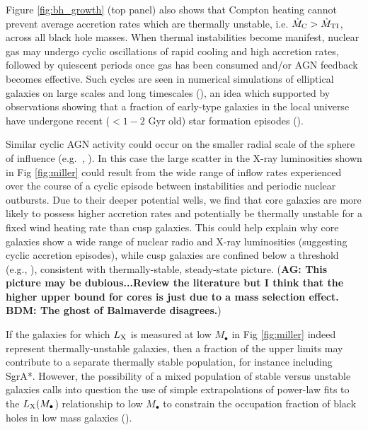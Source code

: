 \documentclass[usenatbib,fleqn]{mn2e}
\begin{document}
Figure \ref{fig:bh_growth} (top panel) also shows that Compton heating cannot prevent average
accretion rates which are thermally unstable, i.e. $\dot{M}_{\rm C} >
\dot{M}_{\rm TI}$, across all
black hole masses.  When thermal instabilities become manifest, nuclear gas may undergo cyclic oscillations of rapid cooling and high accretion rates, followed by quiescent periods once gas has been consumed and/or
AGN feedback becomes effective.  Such cycles are seen in numerical simulations of elliptical galaxies on 
large scales and long timescales (\citealt{Ciotti+10}), an idea which supported by observations showing that a fraction of early-type galaxies in the local universe have undergone recent ($< 1-2$ Gyr old) star formation episodes (\citealt{Donas+07}).  

Similar cyclic AGN activity could occur on the smaller radial scale of the sphere of influence (e.g.~\citealt{Yuan&Li11}, \citealt{Cuadra+15}).  In this case the large scatter in the X-ray luminosities shown in Fig \ref{fig:miller} could result from
the wide range of inflow rates experienced over the course of a cyclic episode between instabilities and periodic nuclear outbursts.  Due to their deeper potential wells, we find that core galaxies are more likely to possess higher accretion
rates and potentially be thermally unstable for a fixed wind heating rate than cusp galaxies.  This could help explain why core galaxies show a wide range of nuclear radio and X-ray luminosities (suggesting cyclic accretion episodes), while cusp galaxies are confined below a threshold (e.g., \citealt{Bender+89, Pellegrini99,   Capetti&Balmaverde05}), consistent with thermally-stable, steady-state picture. ({\bf AG: This picture may be dubious...Review
  the literature but I think that the higher upper bound for cores is
  just due to a mass selection effect.  BDM: The ghost of Balmaverde disagrees.})

If the galaxies for which $L_{\rm X}$ is measured at low $M_{\bullet}$ in Fig
\ref{fig:miller} indeed represent thermally-unstable galaxies, then a fraction of the upper limits may contribute to a separate thermally stable population, for instance including SgrA*.  However, the possibility of a mixed population of stable versus unstable galaxies calls into question the use of simple extrapolations of power-law fits to the $L_{\rm X}(M_{\bullet}$) relationship to low $M_{\bullet}$ to constrain the occupation fraction of black holes in low mass galaxies (\citealt{Miller+15}).
\end{document}
